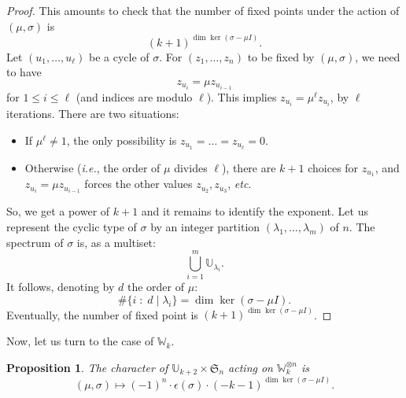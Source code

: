 \documentclass[11pt]{article}
\newtheorem{prop}[theo]{Proposition}
\theoremstyle{definition}
\newcommand{\bU}{\mathbb{U}}
\newcommand{\bW}{\mathbb{W}}
\begin{document}
\begin{proof}
    This amounts to check that the number of fixed points under the action of $(\mu,\sigma)$ is 
    \[
        (k+1)^{\dim\ker(\sigma - \mu I)}.
    \]
    Let $(u_1,\dots,u_\ell)$ be a cycle of $\sigma$.  For $( z_1, \dots, z_n)$ to be fixed by $(\mu,\sigma)$, we need to have
    \[
        z_{u_i} 
            = 
        \mu z_{u_{i-1}} 
    \]
    for $1\leq i \leq \ell$ (and indices are modulo $\ell$).  This implies $z_{u_i} = \mu^{\ell} z_{u_i}$, by $\ell$ iterations.  There are two situations:
    \begin{itemize}
        \item If $\mu^{\ell} \neq 1$, the only possibility is $z_{u_1} = \dots = z_{u_\ell} = 0$.
        \item Otherwise ({\it i.e.}, the order of $\mu$ divides $\ell$), there are $k+1$ choices for $z_{u_1}$, and $z_{u_i} = \mu z_{u_{i-1}} $ forces the other values $z_{u_2}, z_{u_3}$, {\it etc}.
    \end{itemize}
    So, we get a power of $k+1$ and it remains to identify the exponent.  Let us represent the cyclic type of $\sigma$ by an integer partition $(\lambda_1,\dots,\lambda_m)$ of $n$. The spectrum of $\sigma$ is, as a multiset:
    \[
        \bigcup_{i=1}^m \bU_{\lambda_i}.
    \]
    It follows, denoting by $d$ the order of $\mu$:
    \[
        \#\big\{ i \;:\; d\mathrel{|}\lambda_i \big\}
            =
        \dim\ker(\sigma-\mu I).
    \]
    Eventually, the number of fixed point is $(k+1)^{\dim\ker(\sigma-\mu I)}$.
\end{proof}

Now, let us turn to the case of $\bW_k$.  

\begin{prop} \label{prop:algparkessai}
    The character of $\bU_{k+2} \times \mathfrak{S}_n$ acting on $\bW_k^{\otimes n}$ is
    \[
        (\mu, \sigma)
            \mapsto
        (-1)^n \cdot \epsilon(\sigma) \cdot (-k-1)^{\dim\ker(\sigma-\mu I)}.
    \]
\end{prop}
\end{document}
